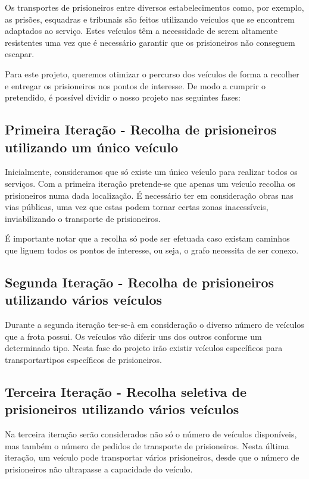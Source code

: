 \documentclass[article, a4paper, 12pt, oneside]{memoir}
\begin{document}
Os transportes de prisioneiros entre diversos estabelecimentos como, por exemplo, as prisões, esquadras e tribunais são feitos utilizando veículos que se encontrem adaptados ao serviço. Estes veículos têm a necessidade de serem altamente resistentes uma vez que é necessário garantir que os prisioneiros não conseguem escapar.

Para este projeto, queremos otimizar o percurso dos veículos de forma a recolher e entregar os prisioneiros nos pontos de interesse. De modo a cumprir o pretendido, é possível dividir o nosso projeto nas seguintes fases:

\subsection{Primeira Iteração - Recolha de prisioneiros utilizando um único veículo}
	Inicialmente, consideramos que só existe um único veículo para realizar todos os serviços.
	Com a primeira iteração pretende-se que apenas um veículo recolha os prisioneiros numa dada localização.
	É necessário ter em consideração obras nas vias públicas, uma vez que estas podem tornar certas zonas inacessíveis, inviabilizando o transporte de prisioneiros. 
	
	É importante notar que a recolha só pode ser efetuada caso existam caminhos que liguem todos os pontos de interesse, ou seja, o grafo necessita de ser conexo.

\subsection{Segunda Iteração - Recolha de prisioneiros utilizando vários veículos}
	Durante a segunda iteração ter-se-à em consideração o diverso número de veículos que a frota possui. Os veículos vão diferir uns dos outros conforme um determinado tipo. Nesta fase do projeto irão existir veículos específicos para transportartipos específicos de prisioneiros.

\subsection{Terceira Iteração - Recolha seletiva de prisioneiros utilizando vários veículos}
	Na terceira iteração serão considerados não só o número de veículos disponíveis, mas também o número de pedidos de transporte de prisioneiros. Nesta última iteração, um veículo pode transportar vários prisioneiros, desde que o número de prisioneiros não ultrapasse a capacidade do veículo.
\end{document}
